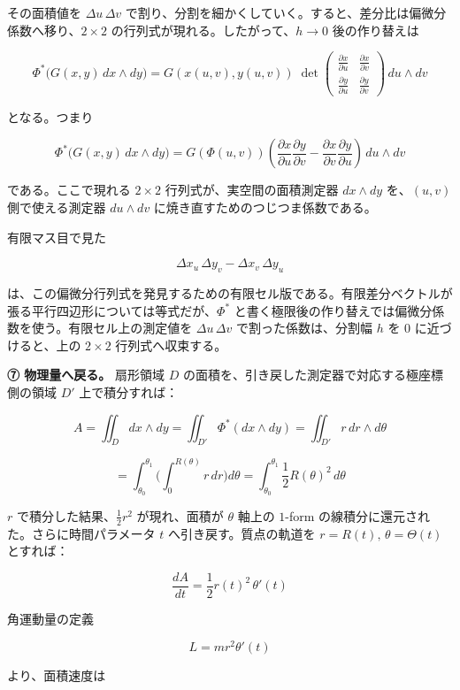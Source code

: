 \documentclass[a4paper,12pt,openany]{book}
\begin{document}
その面積値を \(\Delta u\,\Delta v\)
で割り、分割を細かくしていく。すると、差分比は偏微分係数へ移り、\(2\times2\)
の行列式が現れる。したがって、\(h\to0\) 後の作り替えは

\[\Phi^*\bigl(G(x,y)\,dx \wedge dy\bigr) = G(x(u,v), y(u,v))\;
\det\!\begin{pmatrix}
\frac{\partial x}{\partial u} & \frac{\partial x}{\partial v} \\[6pt]
\frac{\partial y}{\partial u} & \frac{\partial y}{\partial v}
\end{pmatrix}
\,du \wedge dv\]

となる。つまり

\[\Phi^*\bigl(G(x,y)\,dx \wedge dy\bigr)
=G(\Phi(u,v))\left(
\frac{\partial x}{\partial u}\frac{\partial y}{\partial v}
-\frac{\partial x}{\partial v}\frac{\partial y}{\partial u}
\right)\,du\wedge dv\]

である。ここで現れる \(2\times2\) 行列式が、実空間の面積測定器
\(dx\wedge dy\) を、\((u,v)\) 側で使える測定器 \(du\wedge dv\)
に焼き直すためのつじつま係数である。

有限マス目で見た

\[\Delta x_u\,\Delta y_v-\Delta x_v\,\Delta y_u\]

は、この偏微分行列式を発見するための有限セル版である。有限差分ベクトルが張る平行四辺形については等式だが、\(\Phi^*\)
と書く極限後の作り替えでは偏微分係数を使う。有限セル上の測定値を
\(\Delta u\,\Delta v\) で割った係数は、分割幅 \(h\) を \(0\)
に近づけると、上の \(2\times2\) 行列式へ収束する。

\textbf{⑦ 物理量へ戻る。} 扇形領域 \(D\)
の面積を、引き戻した測定器で対応する極座標側の領域 \(D'\)
上で積分すれば：

\[
A
=
\iint_D dx\wedge dy
=
\iint_{D'} \Phi^*(dx\wedge dy)
=
\iint_{D'} r\,dr\wedge d\theta
\]

\[
=
\int_{\theta_0}^{\theta_1}
\biggl(
  \int_0^{R(\theta)} r\,dr
\biggr)
d\theta
=
\int_{\theta_0}^{\theta_1}
\frac{1}{2}R(\theta)^2\,d\theta
\]

\(r\) で積分した結果、\(\frac{1}{2}r^2\) が現れ、面積が \(\theta\)
軸上の \(1\)-form の線積分に還元された。さらに時間パラメータ \(t\)
へ引き戻す。質点の軌道を \(r = R(t),\, \theta = \Theta(t)\) とすれば：

\[
\frac{dA}{dt}
=
\frac{1}{2}r(t)^2\,\theta'(t)
\]

角運動量の定義

\[
L
=
m r^2\theta'(t)
\]

より、面積速度は
\end{document}
